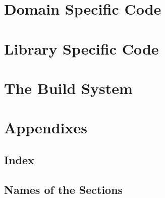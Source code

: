 \documentclass[a4paper,dvips]{book}
\newcommand{\clearemptydoublepage}{\newpage{\pagestyle{empty}\cleardoublepage}}
\begin{document}
\clearemptydoublepage
\part{Domain Specific Code}
\label{part:domain}

















\clearemptydoublepage
\part{Library Specific Code}
\label{part:library}








\clearemptydoublepage
\label{part:build}
\part{The Build System}

%
%
\clearemptydoublepage
\appendix
\part{Appendixes}
\clearemptydoublepage
\chapter{Index}
\nowebindex
\clearemptydoublepage
\chapter{Names of the Sections}
\nowebchunks
\end{document}

